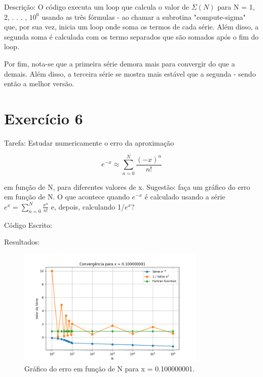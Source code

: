 \documentclass[12pt, a4paper]{article} %
\begin{document}
Descri\c{c}\~ao: O c\'odigo executa um loop que calcula o valor de $\Sigma (N)$ para N = 1, 2, . . . , $10^6$ usando as tr\^es f\'ormulas - ao chamar a subrotina "compute-sigma" que, por sua vez, inicia um loop onde soma os termos de cada s\'erie. Al\'em disso, a segunda soma \'e calculada com os termo separados que s\~ao somados ap\'os o fim do loop.

Por fim, nota-se que a primeira s\'erie demora mais para convergir do que a demais. Al\'em disso, a terceira s\'erie se mostra mais est\'avel que a segunda - sendo ent\~ao a melhor vers\~ao.

\section{Exerc\'icio 6}

Tarefa: Estudar numericamente o erro da aproxima\c{c}\~ao

\begin{equation} e^{-x} \approx \sum_{n=0}^N \frac{(-x)^n}{n!} \end{equation}

em fun\c{c}\~ao de N, para diferentes valores de x. Sugest\~ao: fa\c{c}a um gr\'afico do erro em fun\c{c}\~ao de N. O que acontece quando $e^{-x}$  \'e calculado usando a s\'erie $e^x = \sum_{n=0}^{N} \frac{x^n}{n!}$ e, depois, calculando 1/$e^x$?

C\'odigo Escrito:


Resultados:
\begin{figure}[H]
    \centering
    \includegraphics[width=0.8\textwidth]{../images/grafico_x_0.100000001.png}
    \caption{Gr\'afico do erro em fun\c{c}\~ao de N para x = 0.100000001.}
\end{figure}
\end{document}
